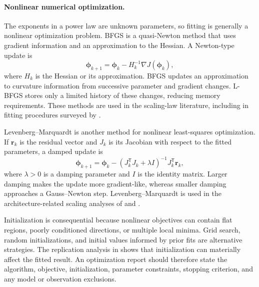 \paragraph{Nonlinear numerical optimization.}
The exponents in a power law are unknown parameters, so fitting is generally
a nonlinear optimization problem. BFGS is a quasi-Newton method that uses
gradient information and an approximation to the Hessian. A Newton-type
update is
\begin{equation}
    \boldsymbol{\phi}_{k+1}
    =
    \boldsymbol{\phi}_{k}
    -
    H_k^{-1}\nabla J(\boldsymbol{\phi}_k),
    \label{eq:scaling-newton-update}
\end{equation}
where \(H_k\) is the Hessian or its approximation. BFGS updates an
approximation to curvature information from successive parameter and
gradient changes. L-BFGS stores only a limited history of these changes,
reducing memory requirements. These methods are used in the scaling-law
literature, including in fitting procedures surveyed by
\textcite{Li2025MisFitting}.

Levenberg--Marquardt is another method for nonlinear least-squares
optimization. If \(\mathbf{r}_k\) is the residual vector and \(J_k\) is its
Jacobian with respect to the fitted parameters, a damped update is
\begin{equation}
    \boldsymbol{\phi}_{k+1}
    =
    \boldsymbol{\phi}_{k}
    -
    \left(J_k^{\mathsf T}J_k+\lambda I\right)^{-1}
    J_k^{\mathsf T}\mathbf{r}_k,
    \label{eq:scaling-levenberg-marquardt}
\end{equation}
where \(\lambda>0\) is a damping parameter and \(I\) is the identity matrix.
Larger damping makes the update more gradient-like, whereas smaller damping
approaches a Gauss--Newton step. Levenberg--Marquardt is used in the
architecture-related scaling analyses of \textcite{Bian2025InferenceEfficient}
and \textcite{Bian2026ArchitectureScaling}.

Initialization is consequential because nonlinear objectives can contain
flat regions, poorly conditioned directions, or multiple local minima.
Grid search, random initializations, and initial values informed by prior
fits are alternative strategies. The replication analysis in
\textcite{Li2025MisFitting} shows that initialization can materially affect
the fitted result. An optimization report should therefore state the
algorithm, objective, initialization, parameter constraints, stopping
criterion, and any model or observation exclusions.

